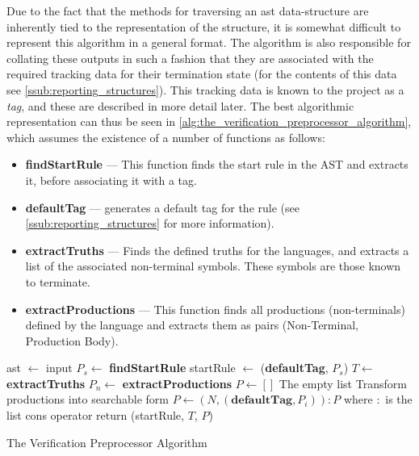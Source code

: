 Due to the fact that the methods for traversing an \gls{ast} data-structure are inherently tied to the representation of the structure, it is somewhat difficult to represent this algorithm in a general format.
The algorithm is also responsible for collating these outputs in such a fashion that they are associated with the required tracking data for their termination state (for the contents of this data see \autoref{ssub:reporting_structures}).
This tracking data is known to the project as a \textit{tag}, and these are described in more detail later. 
The best algorithmic representation can thus be seen in \autoref{alg:the_verification_preprocessor_algorithm}, which assumes the existence of a number of functions as follows: 
\begin{itemize}
    \item \textbf{findStartRule} --- This function finds the start rule in the AST and extracts it, before associating it with a tag.
    \item \textbf{defaultTag} --- generates a default tag for the rule (see \autoref{ssub:reporting_structures} for more information).
    \item \textbf{extractTruths} --- Finds the defined truths for the languages, and extracts a list of the associated non-terminal symbols.
    These symbols are those known to terminate.
    \item \textbf{extractProductions} --- This function finds all productions (non-terminals) defined by the language and extracts them as pairs (Non-Terminal, Production Body). 
\end{itemize}

\begin{algorithm}[!htb]
\begin{algorithmic}
\State
\State ast $\gets$ input
\State
\State $P_s \gets$ \textbf{findStartRule} 
\State startRule $\gets$ (\textbf{defaultTag}, $P_s$)
\State $T \gets$ \textbf{extractTruths}
\State $P_n \gets$ \textbf{extractProductions}
\State $P \gets []$
\Comment The empty list
\Comment Transform productions into searchable form
    \State $P \gets (N, (\textbf{defaultTag}, P_i)) : P$
    \Comment where $:$ is the list cons operator
\EndFor
\State
\State return (startRule, $T$, $P$)
\end{algorithmic}
\caption{The Verification Preprocessor Algorithm}
\label{alg:the_verification_preprocessor_algorithm}
\end{algorithm}

